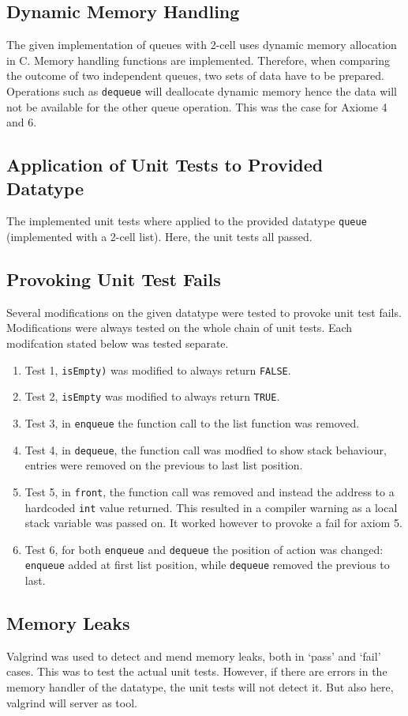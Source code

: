 \documentclass[a4paper,11pt,twoside]{article}
\begin{document}
\subsection{Dynamic Memory Handling}
The given implementation of queues with 2-cell uses dynamic memory
allocation in C. Memory handling functions are implemented. Therefore,
when comparing the outcome of two independent queues, two sets of data
have to be prepared. Operations such as \texttt{dequeue} will
deallocate dynamic memory hence the data will not be available for the
other queue operation. This was the case for Axiome 4 and 6.

\subsection{Application of Unit Tests to Provided Datatype}
The implemented unit tests where applied to the provided datatype
\texttt{queue} (implemented with a 2-cell list). Here, the unit tests 
all passed.

\subsection{Provoking Unit Test Fails}
Several modifications on the given datatype were tested to provoke
unit test fails. Modifications were always tested on the whole chain
of unit tests. Each modifcation stated below was tested separate. 

\begin{enumerate}
\item Test 1, \texttt{isEmpty)} was modified to always 
return \texttt{FALSE}.
\item Test 2, \texttt{isEmpty} was modified to always
    return \texttt{TRUE}.
\item Test 3, in \texttt{enqueue} the function call
  to the list function was removed.
\item Test 4, in \texttt{dequeue}, the function call
  was modfied to show stack behaviour, entries were removed on the
  previous to last list position.
\item Test 5, in \texttt{front}, the function call
  was removed and instead the address to a hardcoded \texttt{int} value
  returned. This resulted in a compiler warning as a local stack
  variable was passed on. It worked however to provoke a fail for axiom
  5.
\item Test 6, for both \texttt{enqueue} and \texttt{dequeue} the
  position of action was changed: \texttt{enqueue} added at first list
  position, while \texttt{dequeue} removed the previous to last.
\end{enumerate} 

\subsection{Memory Leaks}
Valgrind was used to detect and mend memory leaks, both in `pass' and
`fail' cases. This was to test the actual unit tests. However, if
there are errors in the memory handler of the datatype, the unit tests
will not detect it. But also here, valgrind will server as tool.


\end{document}
